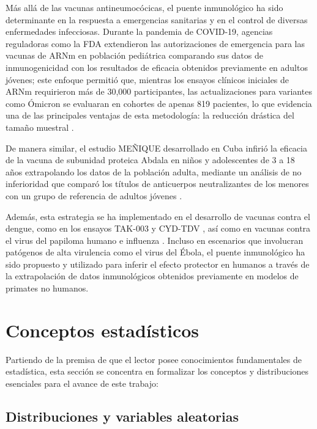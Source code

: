 Más allá de las vacunas antineumocócicas, el puente inmunológico ha sido determinante en la respuesta a emergencias sanitarias y en el control de diversas enfermedades infecciosas. Durante la pandemia de COVID-19, agencias reguladoras como la FDA extendieron las autorizaciones de emergencia para las vacunas de ARNm en población pediátrica comparando sus datos de inmunogenicidad con los resultados de eficacia obtenidos previamente en adultos jóvenes; este enfoque permitió que, mientras los ensayos clínicos iniciales de ARNm requirieron más de 30,000 participantes, las actualizaciones para variantes como Ómicron se evaluaran en cohortes de apenas 819 pacientes, lo que evidencia una de las principales ventajas de esta metodología: la reducción drástica del tamaño muestral \cite{cruz2025}.

De manera similar, el estudio MEÑIQUE desarrollado en Cuba infirió la eficacia de la vacuna de subunidad proteica Abdala en niños y adolescentes de 3 a 18 años extrapolando los datos de la población adulta, mediante un análisis de no inferioridad que comparó los títulos de anticuerpos neutralizantes de los menores con un grupo de referencia de adultos jóvenes \cite{hernandez2024efficacy}.

Además, esta estrategia se ha implementado en el desarrollo de vacunas contra el dengue, como en los ensayos TAK-003 y CYD-TDV \cite{gilbert2019bridging, lefevre2023bridging}, así como en vacunas contra el virus del papiloma humano e influenza \cite{cruz2025}. Incluso en escenarios que involucran patógenos de alta virulencia como el virus del Ébola, el puente inmunológico ha sido propuesto y utilizado para inferir el efecto protector en humanos a través de la extrapolación de datos inmunológicos obtenidos previamente en modelos de primates no humanos\cite{cruz2025}.

\section{Conceptos estadísticos}

Partiendo de la premisa de que el lector posee conocimientos fundamentales de estadística, esta sección se concentra en formalizar los conceptos y distribuciones esenciales para el avance de este trabajo:

\subsection{Distribuciones y variables aleatorias}

